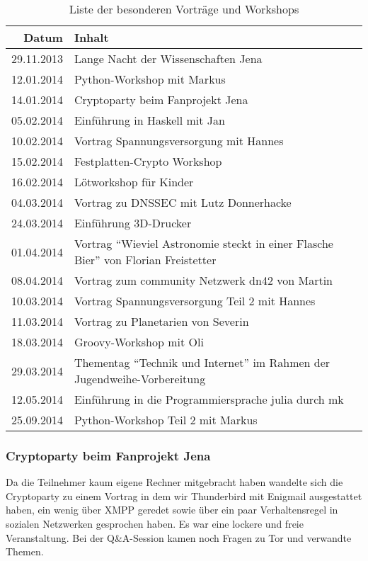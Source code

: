 \documentclass[ngerman,10pt,DIV16]{scrartcl}
\begin{document}
\begin{table}[h]
\begin{tabular}{r|l}
	\textbf{Datum} & \textbf{Inhalt} \\ \hline{}
	29.11.2013 & Lange Nacht der Wissenschaften Jena \\
	12.01.2014 & Python-Workshop mit Markus \\
	14.01.2014 & Cryptoparty beim Fanprojekt Jena \\
	05.02.2014 & Einführung in Haskell mit Jan \\
	10.02.2014 & Vortrag Spannungsversorgung mit Hannes \\
	15.02.2014 & Festplatten-Crypto Workshop \\
	16.02.2014 & Lötworkshop für Kinder \\
	04.03.2014 & Vortrag zu DNSSEC mit Lutz Donnerhacke \\
	24.03.2014 & Einführung 3D-Drucker \\
	01.04.2014 & Vortrag "`Wieviel Astronomie steckt in einer Flasche Bier"' von Florian Freistetter \\
	08.04.2014 & Vortrag zum community Netzwerk dn42 von Martin \\
	10.03.2014 & Vortrag Spannungsversorgung Teil 2 mit Hannes \\
	11.03.2014 & Vortrag zu Planetarien von Severin \\
	18.03.2014 & Groovy-Workshop mit Oli \\
	29.03.2014 & Thementag "`Technik und Internet"' im Rahmen der Jugendweihe-Vorbereitung \\
	12.05.2014 & Einführung in die Programmiersprache julia durch mk \\
	25.09.2014 & Python-Workshop Teil 2 mit Markus \\
	\end{tabular}
	\caption{Liste der besonderen Vorträge und Workshops}
\end{table}

\subsubsection{Cryptoparty beim Fanprojekt Jena}

Da die Teilnehmer kaum eigene Rechner mitgebracht haben wandelte sich die
Cryptoparty zu einem Vortrag in dem wir Thunderbird mit Enigmail ausgestattet
haben, ein wenig über XMPP geredet sowie über ein paar Verhaltensregel in
sozialen Netzwerken gesprochen haben. Es war eine lockere und freie
Veranstaltung. Bei der Q\&A-Session kamen noch Fragen zu Tor und verwandte
Themen.
\end{document}
